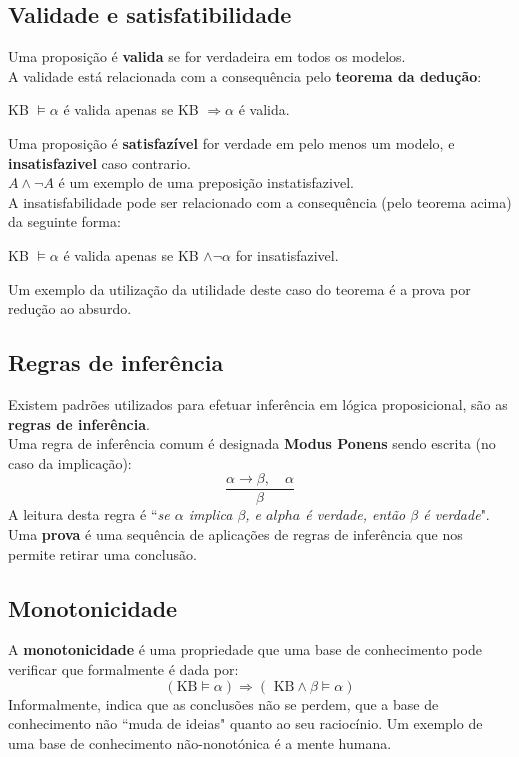 \documentclass[]{report}
\begin{document}
\subsection{Validade e satisfatibilidade}
Uma proposição é \textbf{valida} se for verdadeira em todos os modelos.\\
A validade está relacionada com a consequência pelo \textbf{teorema da dedução}:
\begin{center}
KB $\models \alpha$ é valida apenas se KB $\Rightarrow \alpha$ é valida.
\end{center}
Uma proposição é \textbf{satisfazível} for verdade em pelo menos um modelo, e \textbf{insatisfazivel} caso contrario.\\
$A \wedge \neg A$ é um exemplo de uma preposição instatisfazivel.\\[0.2cm]
A insatisfabilidade pode ser relacionado com a consequência (pelo teorema acima) da seguinte forma:
\begin{center}
KB $\models \alpha$ é valida apenas se KB $\wedge \neg \alpha$ for insatisfazivel.
\end{center}
Um exemplo da utilização da utilidade deste caso do teorema é a prova por redução ao absurdo.
\subsection{Regras de inferência}
Existem padrões utilizados para efetuar inferência em lógica proposicional, são as \textbf{regras de inferência}.\\
Uma regra de inferência comum é designada \textbf{Modus Ponens} sendo escrita (no caso da implicação):
$$\frac{\alpha\to \beta, \quad \alpha}{\beta}$$
A leitura desta regra é ``\textit{se $\alpha$ implica $\beta$, e $alpha$ é verdade, então $\beta$ é verdade}".\\[0.2cm]
Uma \textbf{prova} é uma sequência de aplicações de regras de inferência que nos permite retirar uma conclusão.
\subsection{Monotonicidade}
A \textbf{monotonicidade} é uma propriedade que uma base de conhecimento pode verificar que formalmente é dada por:
$$(\text{KB}\models \alpha) \Rightarrow (\text{ KB}\wedge \beta \models \alpha)$$
Informalmente, indica que as conclusões não se perdem, que a base de conhecimento não ``muda de ideias" quanto ao seu raciocínio.
Um exemplo de uma base de conhecimento não-nonotónica é a mente humana.
\end{document}
